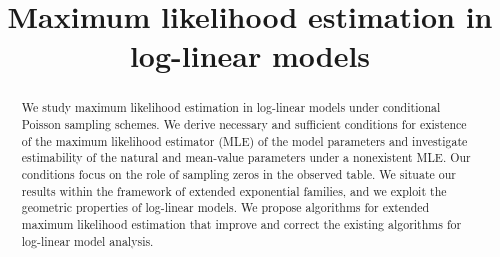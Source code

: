 \documentclass[aos,MSNbibl,nameyear,dvips]{arximspdf}
\begin{document}
%
\begin{frontmatter}

\title{Maximum likelihood estimation in log-linear models}




%
\begin{abstract}
We study maximum likelihood estimation in log-linear models under
conditional Poisson sampling schemes. We derive necessary and
sufficient conditions for existence of the maximum likelihood estimator
(MLE) of the model parameters and investigate estimability of the
natural and mean-value parameters under a nonexistent MLE. Our
conditions focus on the role of sampling zeros in the observed table.
We situate our results within the framework of extended exponential
families, and we exploit the geometric properties of log-linear models.
We propose algorithms for extended maximum likelihood estimation that
improve and correct the existing algorithms for log-linear model
analysis.%
\end{abstract}


\end{frontmatter}
\end{document}
